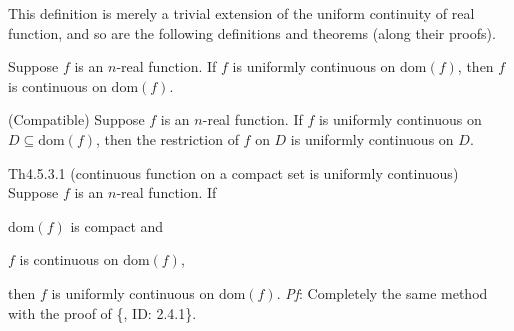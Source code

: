 \documentclass{article}
\begin{document}
\begin{Rmk}{}
    This definition is merely a trivial extension of the uniform continuity of real function, and so are the following definitions and theorems (along their proofs).
    \begin{compactenum}
        \item \textcolor{Th}{Suppose $f$ is an $n$-real function. If $f$ is uniformly continuous on $\text{dom}(f)$, then $f$ is continuous on $\text{dom}(f)$.}
        \item \textcolor{Th}{(Compatible) Suppose $f$ is an $n$-real function. If $f$ is uniformly continuous on $D\subseteq\text{dom}(f)$, then the restriction of $f$ on $D$ is uniformly continuous on $D$.}
    \end{compactenum}
\end{Rmk}

\begin{Th}{Th4.5.3.1 (continuous function on a compact set is uniformly continuous)}
    Suppose $f$ is an $n$-real function. If
    \begin{compactenum}
        \item $\text{dom}(f)$ is compact and
        \item $f$ is continuous on $\text{dom}(f)$,
    \end{compactenum}
    then $f$ is uniformly continuous on $\text{dom}(f)$.
    \tcblower
    \textit{Pf}: Completely the same method with the proof of \{, ID: 2.4.1\}.
\end{Th}
\end{document}
